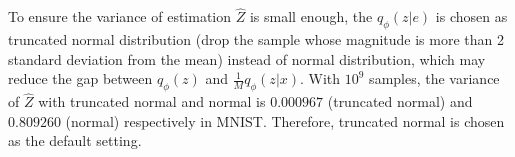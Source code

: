 To ensure the variance of estimation $\hat{Z}$ is small enough, the $q_\phi(z|e)$ is chosen as truncated normal distribution (drop the sample whose magnitude is more than 2 standard deviation from the mean) instead of normal distribution, which may reduce the gap between $q_\phi(z)$ and $\frac{1}{M}{q}_\phi(z|x)$. 
With $10^9$ samples, the variance of $\hat{Z}$ with truncated normal and normal is $0.000967$ (truncated normal) and $0.809260$ (normal) respectively in MNIST. Therefore, truncated normal is chosen as the default setting. 


